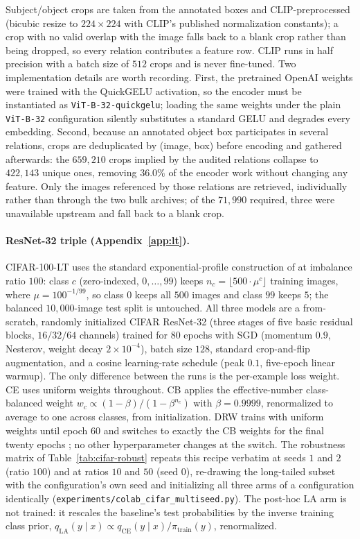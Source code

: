 Subject/object crops are taken from the annotated boxes and CLIP-preprocessed (bicubic
resize to $224\times224$ with CLIP's published normalization constants); a crop with no
valid overlap with the image falls back to a blank crop rather than being dropped, so
every relation contributes a feature row. CLIP runs in half precision with a batch size
of $512$ crops and is never fine-tuned. Two implementation details are worth recording.
First, the pretrained OpenAI weights were trained with the QuickGELU activation, so the
encoder must be instantiated as \texttt{ViT-B-32-quickgelu}; loading the same weights
under the plain \texttt{ViT-B-32} configuration silently substitutes a standard GELU and
degrades every embedding. Second, because an annotated object box participates in
several relations, crops are deduplicated by (image, box) before encoding and gathered
afterwards: the $659{,}210$ crops implied by the audited relations collapse to
$422{,}143$ unique ones, removing $36.0\%$ of the encoder work without changing any
feature. Only the images referenced by those relations are retrieved, individually rather
than through the two bulk archives; of the $71{,}990$ required, three were unavailable
upstream and fall back to a blank crop.

\paragraph{ResNet-32 triple (Appendix~\ref{app:lt}).} CIFAR-100-LT uses the standard
exponential-profile construction of \citet{cui2019classbalanced} at imbalance ratio
$100$: class $c$ (zero-indexed, $0,\ldots,99$) keeps
$n_c=\lfloor 500\cdot\mu^{c}\rfloor$ training images, where
$\mu=100^{-1/99}$, so class $0$ keeps all $500$ images and class $99$ keeps $5$; the
balanced $10{,}000$-image test split is untouched. All three models are a from-scratch,
randomly initialized CIFAR ResNet-32 (three stages of five basic residual blocks,
$16/32/64$ channels) trained for $80$ epochs with SGD (momentum $0.9$, Nesterov,
weight decay $2\times10^{-4}$), batch size $128$, standard crop-and-flip augmentation,
and a cosine learning-rate schedule (peak $0.1$, five-epoch linear warmup). The only
difference between the runs is the per-example loss weight. CE uses uniform weights
throughout. CB applies the effective-number class-balanced weight
$w_c\propto(1-\beta)/(1-\beta^{n_c})$ with $\beta=0.9999$, renormalized to average to
one across classes, from initialization. DRW trains with uniform weights until epoch
$60$ and switches to exactly the CB weights for the final twenty epochs
\citep{cao2019learning}; no other hyperparameter changes at the switch. The robustness
matrix of Table~\ref{tab:cifar-robust} repeats this recipe verbatim at seeds $1$ and $2$
(ratio $100$) and at ratios $10$ and $50$ (seed $0$), re-drawing the long-tailed subset
with the configuration's own seed and initializing all three arms of a configuration
identically (\texttt{experiments/colab\_cifar\_multiseed.py}). The post-hoc LA arm is not
trained: it rescales the baseline's test probabilities by the inverse training class
prior, $q_{\mathrm{LA}}(y\mid x)\propto q_{\mathrm{CE}}(y\mid x)/\pi_{\mathrm{train}}(y)$,
renormalized.

